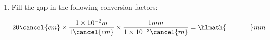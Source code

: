 \documentclass[main.tex]{subfiles}
\begin{document}
\begin{multicols*}{2}
\begin{enumerate}
%
%
%
%
%
%
%
%
%
%
%
%


\item Fill the gap in the following conversion factors:
\begin{center}\[  20\cancel{cm} \times \dfrac{1\times10^{-2}m}{1\cancel{cm}}   \times \dfrac{1mm}{1\times10^{-3}\cancel{m}}       =\hlmath{\hspace{35pt}}mm\]\end{center}
\begin{enumerate}[label=(\alph*)]
\end{enumerate}


\end{enumerate}
\end{multicols*}
\end{document}
